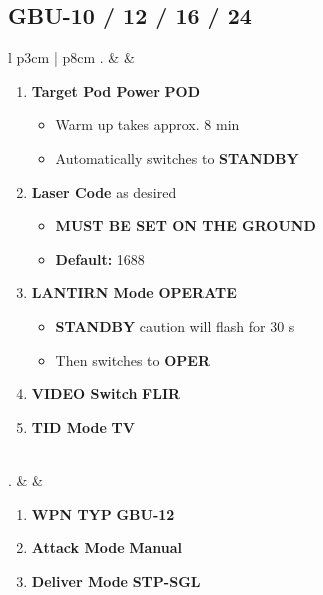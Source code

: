 \documentclass[8pt,usenames,dvipsnames,twoside]{article}
\begin{document}
		\subsection{GBU-10 / 12 / 16 / 24}
		\begin{center}
			\begin{longtable}{l p{3cm} | p{8cm}}
				. &  & 
				\begin{minipage}[t]{\linewidth}
					\vspace{-7pt}
					\begin{enumerate}[label=(\alph*)]
						\item \textbf{Target Pod Power} \dotfill \textbf{POD}
						\begin{itemize}
							\item Warm up takes approx. 8 min
							\item Automatically switches to \textbf{STANDBY}
						\end{itemize}
						\item \textbf{Laser Code} \dotfill as desired
						\begin{itemize}
							\item \textbf{MUST BE SET ON THE GROUND}
							\item \textbf{Default:} 1688
						\end{itemize}
						\item \textbf{LANTIRN Mode} \dotfill \textbf{OPERATE}
						\begin{itemize}
							\item \textbf{STANDBY} caution will flash for 30 s
							\item Then switches to \textbf{OPER}
						\end{itemize}
						\item \textbf{VIDEO Switch} \dotfill \textbf{FLIR}
						\item \textbf{TID Mode} \dotfill \textbf{TV}
					\end{enumerate}
				\end{minipage} \\
				. &  & 
				\begin{minipage}[t]{\linewidth}
					\vspace{-7pt}
					\begin{enumerate}[label=(\alph*)]
						\item \textbf{WPN TYP} \dotfill \textbf{GBU-12}
						\item \textbf{Attack Mode} \dotfill \textbf{Manual}
						\item \textbf{Deliver Mode} \dotfill \textbf{STP-SGL}

\end{enumerate}
\end{minipage}
\end{longtable}
\end{center}
\end{document}
